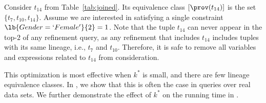
\begin{example}\label{ex:optimization1}
    Consider $t_{14}$ from Table~\ref{tab:joined}. Its equivalence class $[\prov(t_{14})]$ is the set $\{t_7, t_{10}, t_{14}\}$. Assume we are interested in satisfying a single constraint $\lb{Gender=`Female'}{2} = 1$. Note that the tuple $t_{14}$ can never appear in the top-$2$ of any refinement query, as any refinement that includes $t_{14}$ includes tuples with its same lineage, i.e., $t_7$ and $t_{10}$. Therefore, it is safe to remove all variables and expressions related to $t_{14}$ from consideration.
\end{example}
This optimization is most effective when $k^*$ is small, and there are few lineage equivalence classes. In , we show that this is often the case in queries over real data sets. We further demonstrate the effect of $k^*$ on the running time in .


